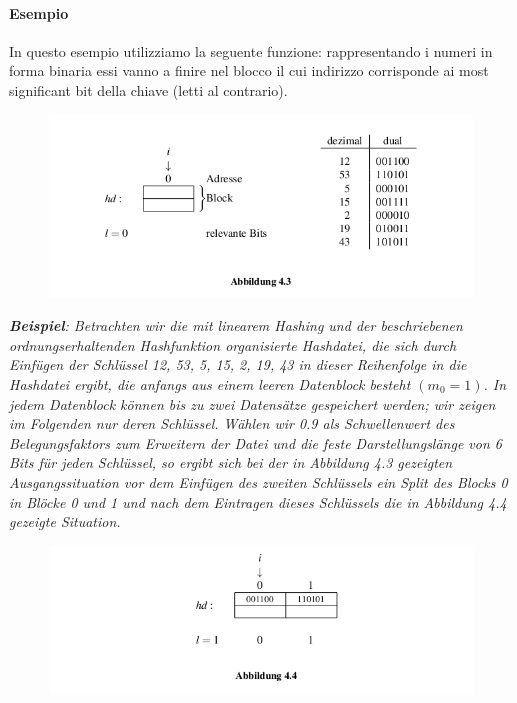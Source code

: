 \documentclass[a4paper]{book}
\begin{document}
\paragraph*{Esempio} In questo esempio utilizziamo la seguente funzione: rappresentando i numeri in forma binaria essi vanno a finire nel blocco il cui indirizzo corrisponde ai most significant bit della chiave (letti al contrario). 
\begin{figure}[H]
\centering
\includegraphics[scale=0.5]{Figures/bsp1.png}
\end{figure}
\emph{\textbf{Beispiel}: Betrachten wir die mit linearem Hashing und der beschriebenen ordnungserhaltenden Hashfunktion organisierte Hashdatei, die sich durch Einfügen der Schlüssel 12, 53, 5, 15, 2, 19, 43 in dieser Reihenfolge in die Hashdatei ergibt, die anfangs aus einem leeren Datenblock besteht 
$(m_0 = 1)$. In jedem Datenblock können bis zu zwei Datensätze gespeichert werden; wir zeigen im Folgenden nur deren Schlüssel. Wählen wir 0.9 als Schwellenwert des Belegungsfaktors zum Erweitern der Datei und die feste Darstellungslänge von 6 Bits für jeden Schlüssel, so ergibt sich bei der in
 Abbildung 4.3 gezeigten Ausgangssituation vor dem Einfügen des zweiten Schlüssels ein Split des Blocks 0 in Blöcke 0 und 1 und nach dem Eintragen dieses Schlüssels die in Abbildung 4.4 gezeigte Situation.}
\begin{figure}[H]
\centering
\includegraphics[scale=0.5]{Figures/bsp2.png}
\end{figure}
\end{document}
